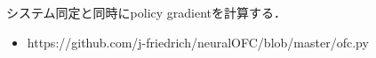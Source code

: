 システム同定と同時にpolicy gradientを計算する．
\begin{itemize}
\item https://github.com/j-friedrich/neuralOFC/blob/master/ofc.py
\end{itemize}

   
